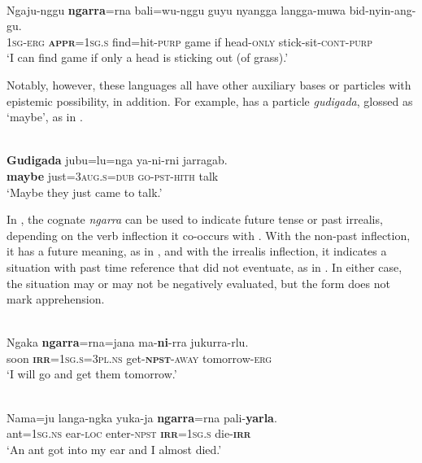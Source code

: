 \documentclass[output=paper,colorlinks,citecolor=brown]{langscibook}
\begin{document}
\ea
{} \\
\gll Ngaju-nggu \textbf{ngarra}=rna bali=wu-nggu guyu nyangga langga-muwa bid-nyin-ang-gu. \\
\textsc{1sg-erg} \textsc{\textbf{appr}=1sg.s} find=hit-\textsc{purp} game if head-\textsc{only} stick-sit-\textsc{cont-purp} \\
\glt `I can find game if only a head is sticking out (of grass).'
\label{ex:bro65}
\z

 Notably, however, these languages all have other auxiliary bases or particles with epistemic possibility, in addition. For example,  has a particle \textit{gudigada}, glossed as `maybe', as in .

\ea 
{} \\
\gll \textbf{Gudigada} jubu=lu=nga ya-ni-rni jarragab. \\
\textbf{maybe} just=\textsc{3aug.s=dub} \textsc{go-pst-hith} talk \\
\glt `Maybe they just came to talk.'
\label{ex:bro66}
\z



In , the cognate \textit{ngarra} can be used to indicate future tense or past irrealis, depending on the verb inflection it co-occurs with \citep[788]{laughren_warlpiri-english_2007}. With the non-past inflection, it has a future meaning, as in , and with the irrealis inflection, it indicates a situation with past time reference that did not eventuate, as in . In either case, the situation may or may not be negatively evaluated, but the form does not mark apprehension.

\ea 
{} \\
\gll Ngaka \textbf{ngarra}=rna=jana ma-\textbf{ni}-rra jukurra-rlu. \\
soon \textsc{\textbf{irr}=1sg.s=3pl.ns} get-\textsc{\textbf{npst}-away} tomorrow-\textsc{erg} \\
\glt `I will go and get them tomorrow.'
\label{ex:bro67}
\z


\ea 
{} \\
\gll Nama=ju langa-ngka yuka-ja \textbf{ngarra}=rna pali-\textbf{yarla}. \\
ant=\textsc{1sg.ns} ear-\textsc{loc} enter-\textsc{npst} \textsc{\textbf{irr}=1sg.s} die-\textsc{\textbf{irr}} \\
\glt `An ant got into my ear and I almost died.'
\label{ex:bro68}
\z
\end{document}
